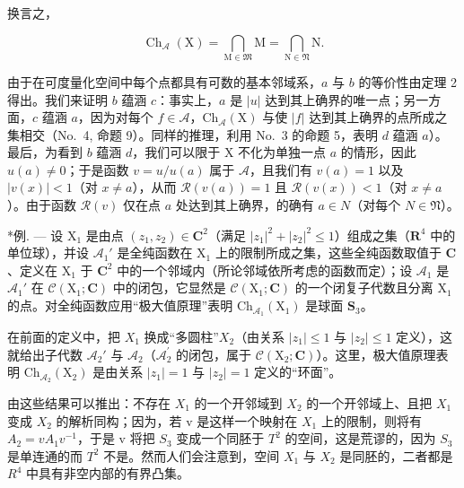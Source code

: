 换言之，

\[
\operatorname{Ch} _ {\mathcal {A}} (\mathrm{X}) = \bigcap_ {\mathrm{M} \in \mathfrak {M}} \mathrm{M} = \bigcap_ {\mathrm{N} \in \mathfrak {N}} \mathrm{N}.\tag{18}
\]

由于在可度量化空间中每个点都具有可数的基本邻域系，\(a\) 与 \(b\) 的等价性由定理 2 得出。我们来证明 \(b\) 蕴涵 \(c\)：事实上，\(a\) 是 \(|u|\) 达到其上确界的唯一点；另一方面，\(c\) 蕴涵 \(a\)，因为对每个 \(f \in \mathcal{A}\)，\(\mathrm{Ch}_{\mathcal{A}}(\mathrm{X})\) 与使 \(|f|\) 达到其上确界的点所成之集相交（No.~4, 命题 9）。同样的推理，利用 No.~3 的命题 5，表明 \(d\) 蕴涵 \(a\)）。最后，为看到 \(b\) 蕴涵 \(d\)，我们可以限于 X 不化为单独一点 \(a\) 的情形，因此 \(u(a) \neq 0\)；于是函数 \(v = u / u(a)\) 属于 \(\mathcal{A}\)，且我们有 \(v(a) = 1\) 以及 \(|v(x)| < 1\)（对 \(x \neq a\)），从而 \(\mathcal{R}(v(a)) = 1\) 且 \(\mathcal{R}(v(x)) < 1\)（对 \(x \neq a\)）。由于函数 \(\mathcal{R}(v)\) 仅在点 \(a\) 处达到其上确界，的确有 \(a \in N\)（对每个 \(N \in \mathfrak{N}\)）。

*例. --- 设 \(\mathrm{X}_1\) 是由点 \((z_1, z_2) \in \mathbf{C}^2\)（满足 \(|z_1|^2 + |z_2|^2 \leqslant 1\)）组成之集（\(\mathbf{R}^4\) 中的单位球），并设 \(\mathcal{A}_1'\) 是全纯函数在 \(\mathrm{X}_1\) 上的限制所成之集，这些全纯函数取值于 \(\mathbf{C}\)、定义在 \(\mathrm{X}_1\) 于 \(\mathbf{C}^2\) 中的一个邻域内（所论邻域依所考虑的函数而定）；设 \(\mathcal{A}_1\) 是 \(\mathcal{A}_1'\) 在 \(\mathcal{C}(\mathrm{X}_1; \mathbf{C})\) 中的闭包，它显然是 \(\mathcal{C}(\mathrm{X}_1; \mathbf{C})\) 的一个闭复子代数且分离 \(\mathrm{X}_1\) 的点。对全纯函数应用“极大值原理”表明 \(\mathrm{Ch}_{\mathcal{A}_1}(\mathrm{X}_1)\) 是球面 \(\mathbf{S}_3\)。

在前面的定义中，把 \(X_1\) 换成“多圆柱”\(X_2\)（由关系 \(|z_1| \leqslant 1\) 与 \(|z_2| \leqslant 1\) 定义），这就给出子代数 \(\mathscr{A}_2'\) 与 \(\mathscr{A}_2\)（\(\mathcal{A}_2^{\prime}\) 的闭包，属于 \(\mathcal{C}(\mathrm{X}_2; \mathbf{C})\)）。这里，极大值原理表明 \(\mathrm{Ch}_{\mathcal{A}_2}(\mathrm{X}_2)\) 是由关系 \(|z_1| = 1\) 与 \(|z_2| = 1\) 定义的“环面”。

由这些结果可以推出：不存在 \(X_{1}\) 的一个开邻域到 \(X_{2}\) 的一个开邻域上、且把 \(X_{1}\) 变成 \(X_{2}\) 的解析同构；因为，若 v 是这样一个映射在 \(X_{1}\) 上的限制，则将有 \(A_{2}=vA_{1}v^{-1}\)，于是 v 将把 \(S_{3}\) 变成一个同胚于 \(T^{2}\) 的空间，这是荒谬的，因为 \(S_{3}\) 是单连通的而 \(T^{2}\) 不是。然而人们会注意到，空间 \(X_{1}\) 与 \(X_{2}\) 是同胚的，二者都是 \(R^{4}\) 中具有非空内部的有界凸集。

